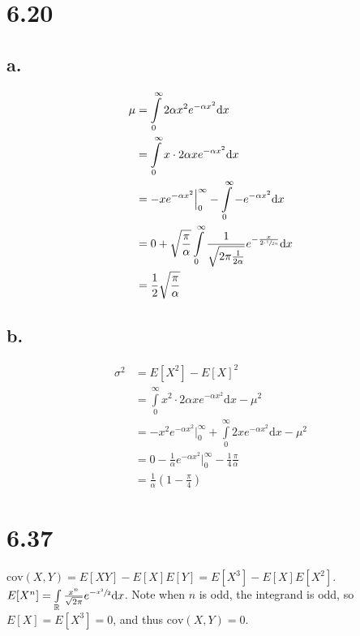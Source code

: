 \documentclass{article}
\begin{document}
\section*{6.20}
\subsection*{a.}
\begin{equation*}
\begin{split}
    \mu &= \int\limits_0^\infty 2\alpha x^2e^{-\alpha x^2} \mathrm{d}x\\
    &= \int\limits_0^\infty x \cdot 2\alpha xe^{-\alpha x^2} \mathrm{d}x\\
    &= -xe^{-\alpha x^2} \Big\rvert_0^\infty - \int\limits_0^\infty -e^{-\alpha x^2} \mathrm{d}x\\
    &= 0 + \sqrt{\frac{\pi}{\alpha}}\int\limits_0^\infty \frac{1}{\sqrt{2\pi \frac{1}{2\alpha}}}e^{-\frac{x}{2\cdot\sfrac{1}{2\alpha}}} \mathrm{d}x\\
    &= \frac{1}{2}\sqrt{\frac{\pi}{\alpha}}
\end{split}
\end{equation*}

\subsection*{b.}
\begin{equation*}
\begin{split}
    \sigma^2 &= E[X^2] - E[X]^2\\
    &= \int\limits_0^\infty x^2 \cdot 2\alpha x e^{-\alpha x^2} \mathrm{d}x - \mu^2\\
    &= -x^2e^{-\alpha x^2} \Big\rvert_0^\infty + \int\limits_0^\infty 2xe^{-\alpha x^2} \mathrm{d}x - \mu^2\\
    &= 0 - \frac{1}{\alpha}e^{-\alpha x^2} \Big\rvert_0^\infty  - \frac{1}{4}\frac{\pi}{\alpha}\\
    &= \frac{1}{\alpha}\left(1 - \frac{\pi}{4}\right)
\end{split}
\end{equation*}

\section*{6.37}
$\mathrm{cov}(X,Y) = E[XY] - E[X]E[Y] = E[X^3] - E[X]E[X^2]$.\\
$E[X^n] = \int\limits_\mathbb{R} \frac{x^n}{\sqrt{2\pi}}e^{-\sfrac{x^2}{2}} \mathrm{d}x$. Note when $n$ is odd, the integrand is odd, so $E[X] = E[X^3] = 0$, and thus $\mathrm{cov}(X,Y) = 0$.
\end{document}
